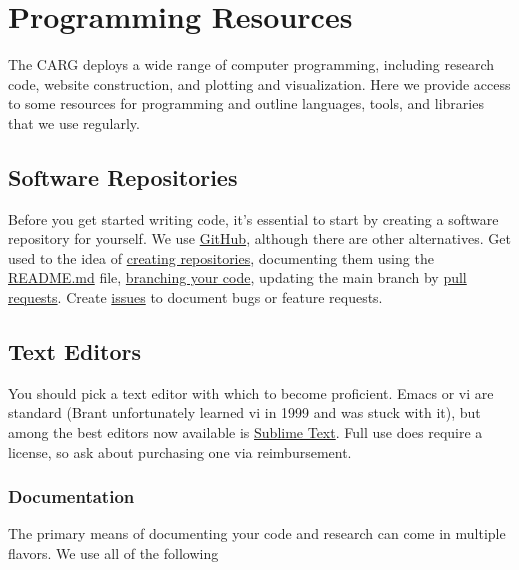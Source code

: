 \section{Programming Resources}
\label{sec:programming}

The CARG deploys a wide range of computer programming, including research code, website construction, and plotting and visualization. Here we provide access to some resources for programming and outline languages, tools, and libraries that we use regularly.

\subsection{Software Repositories}
\label{sec:github}

Before you get started writing code, it's essential to start by creating a software repository for yourself. We use
\href{https://github.com}{GitHub}, although there are other alternatives. Get used to the idea of \href{https://help.github.com/en/github/getting-started-with-github/create-a-repo}{creating repositories}, documenting them using the \href{https://help.github.com/en/github/creating-cloning-and-archiving-repositories/about-readmes}{README.md} file, \href{https://help.github.com/en/github/collaborating-with-issues-and-pull-requests/about-branches}{branching your code}, updating the main branch by \href{https://help.github.com/en/github/collaborating-with-issues-and-pull-requests/about-pull-requests}{pull requests}. Create \href{https://guides.github.com/features/issues/}{issues} to document bugs or feature requests.

\subsection{Text Editors}
\label{sec:editors}

You should pick a text editor with which to become proficient. Emacs or vi are standard (Brant unfortunately learned vi in 1999 and was stuck with it), but among the best editors now available is \href{https://www.sublimetext.com/}{Sublime Text}. Full use does require a license, so ask about purchasing one via reimbursement.

\subsubsection{Documentation}
\label{sec:documentation}

The primary means of documenting your code and research can come in multiple flavors.  We use all of the following

